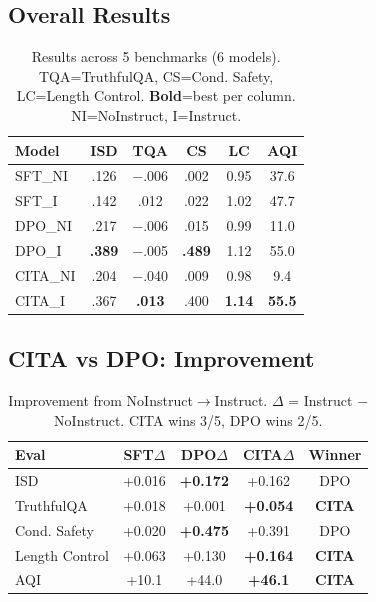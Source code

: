 
\label{sec:results}

\subsection{Overall Results}

\begin{table}[H]
\centering
\footnotesize
\begin{tabular}{@{}lccccc@{}}
\toprule
\textbf{Model} & \textbf{ISD} & \textbf{TQA} & \textbf{CS} & \textbf{LC} & \textbf{AQI} \\
\midrule
SFT\_NI & .126 & $-$.006 & .002 & 0.95 & 37.6 \\
SFT\_I & .142 & .012 & .022 & 1.02 & 47.7 \\
DPO\_NI & .217 & $-$.006 & .015 & 0.99 & 11.0 \\
DPO\_I & \textbf{.389} & $-$.005 & \textbf{.489} & 1.12 & 55.0 \\
CITA\_NI & .204 & $-$.040 & .009 & 0.98 & 9.4 \\
CITA\_I & .367 & \textbf{.013} & .400 & \textbf{1.14} & \textbf{55.5} \\
\bottomrule
\end{tabular}
\caption{Results across 5 benchmarks (6 models). TQA=TruthfulQA, CS=Cond. Safety, LC=Length Control. \textbf{Bold}=best per column. NI=NoInstruct, I=Instruct.}
\label{tab:overall_results}
\end{table}

\subsection{CITA vs DPO: Improvement}

\begin{table}[H]
\centering
\footnotesize
\begin{tabular}{@{}lcccc@{}}
\toprule
\textbf{Eval} & \textbf{SFT$\Delta$} & \textbf{DPO$\Delta$} & \textbf{CITA$\Delta$} & \textbf{Winner} \\
\midrule
ISD & +0.016 & \textbf{+0.172} & +0.162 & DPO \\
TruthfulQA & +0.018 & +0.001 & \textbf{+0.054} & \textbf{CITA} \\
Cond. Safety & +0.020 & \textbf{+0.475} & +0.391 & DPO \\
Length Control & +0.063 & +0.130 & \textbf{+0.164} & \textbf{CITA} \\
AQI & +10.1 & +44.0 & \textbf{+46.1} & \textbf{CITA} \\
\bottomrule
\end{tabular}
\caption{Improvement from NoInstruct$\rightarrow$Instruct. $\Delta$ = Instruct $-$ NoInstruct. CITA wins 3/5, DPO wins 2/5.}
\label{tab:improvement_comparison}
\end{table}

